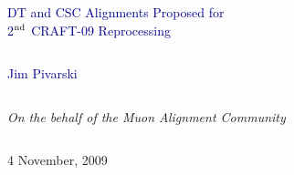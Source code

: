\documentclass[compress]{beamer}
\begin{document}
\begin{frame}
\vfill
\begin{center}
\textcolor{darkblue}{\Large DT and CSC Alignments Proposed for \\ \vspace{0.25 cm} 2$^{\mbox{\scriptsize nd}}$ CRAFT-09 Reprocessing}

\vfill
\begin{columns}
\begin{center}
\large
\textcolor{darkblue}{Jim Pivarski}
\end{center}
\end{columns}

\begin{columns}
\begin{center}
\scriptsize
{\it On the behalf of the Muon Alignment Community}
\end{center}
\end{columns}

\vfill
4 November, 2009

\end{center}
\end{frame}


\small
\end{document}
